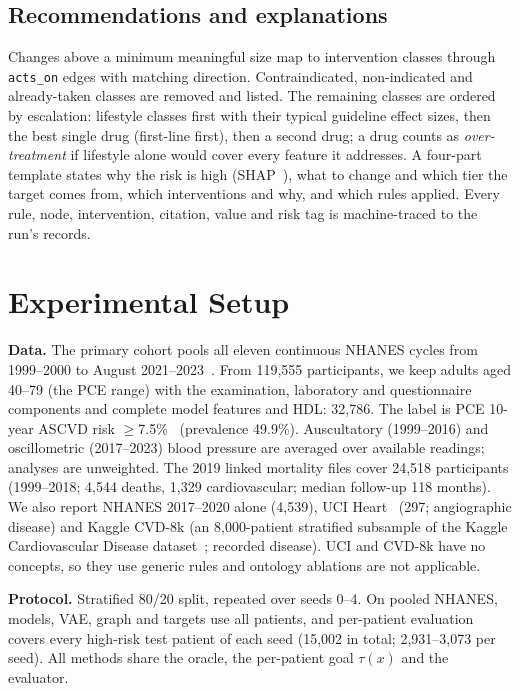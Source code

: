 \documentclass[conference]{IEEEtran}
\begin{document}
\subsection{Recommendations and explanations}
Changes above a minimum meaningful size map to intervention classes through \texttt{acts\_on} edges with matching direction. Contraindicated, non-indicated and already-taken classes are removed and listed. The remaining classes are ordered by escalation: lifestyle classes first with their typical guideline effect sizes, then the best single drug (first-line first), then a second drug; a drug counts as \emph{over-treatment} if lifestyle alone would cover every feature it addresses. A four-part template states why the risk is high (SHAP~\cite{lundberg2017shap}), what to change and which tier the target comes from, which interventions and why, and which rules applied. Every rule, node, intervention, citation, value and risk tag is machine-traced to the run's records.

\section{Experimental Setup}
\textbf{Data.} The primary cohort pools all eleven continuous NHANES cycles from 1999--2000 to August 2021--2023~\cite{nhanes}. From 119,555 participants, we keep adults aged 40--79 (the PCE range) with the examination, laboratory and questionnaire components and complete model features and HDL: 32,786. The label is PCE 10-year ASCVD risk $\ge$7.5\%~\cite{goff2014pce} (prevalence 49.9\%). Auscultatory (1999--2016) and oscillometric (2017--2023) blood pressure are averaged over available readings; analyses are unweighted. The 2019 linked mortality files cover 24,518 participants (1999--2018; 4,544 deaths, 1,329 cardiovascular; median follow-up 118 months). We also report NHANES 2017--2020 alone (4,539), UCI Heart~\cite{detrano1989} (297; angiographic disease) and Kaggle CVD-8k (an 8,000-patient stratified subsample of the Kaggle Cardiovascular Disease dataset~\cite{ulianova2019cardio}; recorded disease). UCI and CVD-8k have no concepts, so they use generic rules and ontology ablations are not applicable. %

\textbf{Protocol.} Stratified 80/20 split, repeated over seeds 0--4. On pooled NHANES, models, VAE, graph and targets use all patients, and per-patient evaluation covers every high-risk test patient of each seed (15,002 in total; 2,931--3,073 per seed). All methods share the oracle, the per-patient goal $\tau(x)$ and the evaluator.
\end{document}
